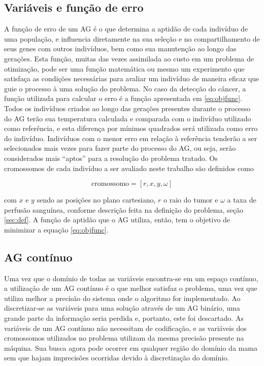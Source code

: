 \subsection{Variáveis e função de erro}
A função de erro de um AG é o que determina a aptidão de cada indivíduo de uma população, e influencia diretamente na sua seleção e no compartilhamento de seus genes com outros indivíduos, bem como sua manutenção ao longo das gerações. Esta função, muitas das vezes assimilada ao custo em um problema de otimização, pode ser uma função matemática ou mesmo um experimento que satisfaça as condições necessárias para avaliar um indivíduo de maneira eficaz que guie o processo à uma solução do problema. No caso da detecção do câncer, a função utilizada para calcular o erro é a função apresentada em \ref{eq:objfunc}. Todos os indivíduos criados ao longo das gerações presentes durante o processo do AG terão sua temperatura calculada e comparada com o indivíduo utilizado como referência, e esta diferença por mínimos quadrados será utilizada como erro do indivíduo. Indivíduos com o menor erro em relação à referência tenderão a ser selecionados mais vezes para fazer parte do processo do AG, ou seja, serão considerados mais ``aptos'' para a resolução do problema tratado. Os cromossomos de cada indivíduo a ser avaliado neste trabalho são definidos como

\begin{equation}
\textrm{cromossomo} = [ r, x, y, \omega ]
\end{equation}

\noindent com $x$ e $y$ sendo as posições no plano cartesiano, $r$ o raio do tumor e $\omega$ a taxa de perfusão sanguínea, conforme descrição feita na definição do problema, seção \ref{sec:def}. A função de aptidão que o AG utiliza, então, tem o objetivo de minimizar a equação \ref{eq:objfunc}.

\subsection{AG contínuo}
Uma vez que o domínio de todas as variáveis encontra-se em um espaço contínuo, a utilização de um AG contínuo é o que melhor satisfaz o problema, uma vez que utiliza melhor a precisão do sistema onde o algoritmo for implementado. Ao discretizar-se as variáveis para uma solução através de um AG binário, uma grande parte da informação seria perdida e, portanto, este foi descartado. As variáveis de um AG contínuo não necessitam de codificação, e as variáveis dos cromossomos utilizados no problema utilizam da mesma precisão presente na máquina. Sua busca agora pode ocorrer em qualquer região do domínio da mama sem que hajam imprecisões ocorridas devido à discretização do domínio.

